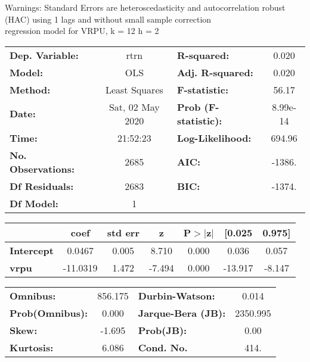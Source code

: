 Warnings: \newline
 [1] Standard Errors are heteroscedasticity and autocorrelation robust (HAC) using 1 lags and without small sample correction\\ 

regression model for VRPU, k = 12 h = 2\begin{center}
\begin{tabular}{lclc}
\toprule
\textbf{Dep. Variable:}    &       rtrn       & \textbf{  R-squared:         } &     0.020   \\
\textbf{Model:}            &       OLS        & \textbf{  Adj. R-squared:    } &     0.020   \\
\textbf{Method:}           &  Least Squares   & \textbf{  F-statistic:       } &     56.17   \\
\textbf{Date:}             & Sat, 02 May 2020 & \textbf{  Prob (F-statistic):} &  8.99e-14   \\
\textbf{Time:}             &     21:52:23     & \textbf{  Log-Likelihood:    } &    694.96   \\
\textbf{No. Observations:} &        2685      & \textbf{  AIC:               } &    -1386.   \\
\textbf{Df Residuals:}     &        2683      & \textbf{  BIC:               } &    -1374.   \\
\textbf{Df Model:}         &           1      & \textbf{                     } &             \\
\bottomrule
\end{tabular}
\begin{tabular}{lcccccc}
                   & \textbf{coef} & \textbf{std err} & \textbf{z} & \textbf{P$> |$z$|$} & \textbf{[0.025} & \textbf{0.975]}  \\
\midrule
\textbf{Intercept} &       0.0467  &        0.005     &     8.710  &         0.000        &        0.036    &        0.057     \\
\textbf{vrpu}      &     -11.0319  &        1.472     &    -7.494  &         0.000        &      -13.917    &       -8.147     \\
\bottomrule
\end{tabular}
\begin{tabular}{lclc}
\textbf{Omnibus:}       & 856.175 & \textbf{  Durbin-Watson:     } &    0.014  \\
\textbf{Prob(Omnibus):} &   0.000 & \textbf{  Jarque-Bera (JB):  } & 2350.995  \\
\textbf{Skew:}          &  -1.695 & \textbf{  Prob(JB):          } &     0.00  \\
\textbf{Kurtosis:}      &   6.086 & \textbf{  Cond. No.          } &     414.  \\
\bottomrule
\end{tabular}
\end{center}

